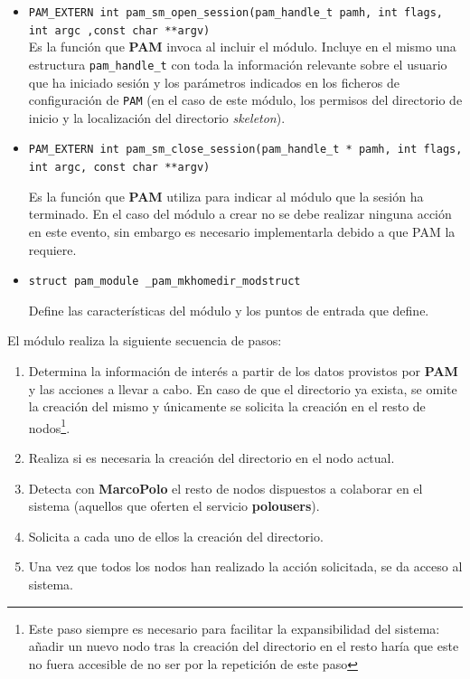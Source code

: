 \begin{itemize}
\item \texttt{PAM\_EXTERN int pam\_sm\_open\_session(pam\_handle\_t \* pamh, int flags, int argc ,const char **argv)}\\

Es la función que \textbf{PAM} invoca al incluir el módulo. Incluye en el mismo una estructura \texttt{pam\_handle\_t} con toda la información relevante sobre el usuario que ha iniciado sesión y los parámetros indicados en los ficheros de configuración de \texttt{PAM} (en el caso de este módulo, los permisos del directorio de inicio y la localización del directorio \textit{skeleton}). 


\item \texttt{PAM\_EXTERN int pam\_sm\_close\_session(pam\_handle\_t * pamh, int flags, int argc, const char **argv)}

Es la función que \textbf{PAM} utiliza para indicar al módulo que la sesión ha terminado. En el caso del módulo a crear no se debe realizar ninguna acción en este evento, sin embargo es necesario implementarla debido a que PAM la requiere.

\item \texttt{struct pam\_module \_pam\_mkhomedir\_modstruct}

Define las características del módulo y los puntos de entrada que define.
\end{itemize}

El módulo realiza la siguiente secuencia de pasos:

\begin{enumerate}
\item Determina la información de interés a partir de los datos provistos por \textbf{PAM} y las acciones a llevar a cabo. En caso de que el directorio ya exista, se omite la creación del mismo y únicamente se solicita la creación en el resto de nodos\footnote{Este paso siempre es necesario para facilitar la expansibilidad del sistema: añadir un nuevo nodo tras la creación del directorio en el resto haría que este no fuera accesible de no ser por la repetición de este paso}.
\item Realiza si es necesaria la creación del directorio en el nodo actual.
\item Detecta con \textbf{MarcoPolo} el resto de nodos dispuestos a colaborar en el sistema (aquellos que oferten el servicio \textbf{polousers}).
\item Solicita a cada uno de ellos la creación del directorio.
\item Una vez que todos los nodos han realizado la acción solicitada, se da acceso al sistema.
\end{enumerate}

